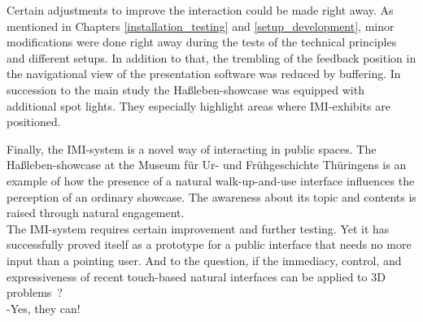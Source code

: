 Certain adjustments to improve the interaction could be made right away. As mentioned in Chapters \ref{installation_testing} and \ref{setup_development}, minor modifications were done right away during the tests of the technical principles and different setups. In addition to that, the trembling of the feedback position in the navigational view of the presentation software was reduced by buffering. In succession to the main study the Haßleben-showcase was equipped with additional spot lights. They especially highlight areas where \ac{IMI}-exhibits are positioned.   

Finally, the \ac{IMI}-system is a novel way of interacting in public spaces. The Haßleben-showcase at the Museum für Ur- und Frühgeschichte Thüringens is an example of how the presence of a natural walk-up-and-use interface influences the perception of an ordinary showcase. The awareness about its topic and contents is raised through natural engagement. 
\\
The \ac{IMI}-system requires certain improvement and further testing. Yet it has successfully proved itself as a prototype for a public interface that needs no more input than a pointing user. And to the question, if the immediacy, control, and expressiveness of recent touch-based natural interfaces can be applied to 3D problems~\cite{ForewordCnG}?\\
-Yes, they can!

%
